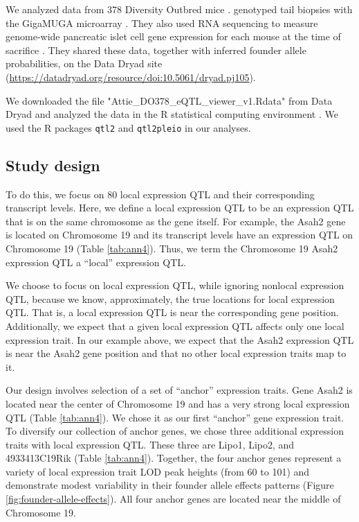 \documentclass{article}
\begin{document}
We analyzed data from 378 Diversity Outbred mice \citep{keller2018genetic}. \citet{keller2018genetic} genotyped tail biopsies with the GigaMUGA microarray \citep{morgan2016mouse}. They also used RNA sequencing to measure genome-wide pancreatic islet cell gene expression for each mouse at the time of sacrifice \citep{keller2018genetic}. They shared these data, together with inferred founder allele probabilities, on the Data Dryad site (\url{https://datadryad.org/resource/doi:10.5061/dryad.pj105}). 

We downloaded the file "Attie\_DO378\_eQTL\_viewer\_v1.Rdata" from Data Dryad \citep{keller2018genetic} and analyzed the data in the R statistical computing environment \citep{r}. We used the R packages \texttt{qtl2} \citep{Broman2018} and \texttt{qtl2pleio} \citep{qtl2pleio} in our analyses. 

\subsection{Study design}

To do this, we focus on 80 local expression QTL and their corresponding transcript levels. Here, we define a local expression QTL to be an expression QTL that is on the same chromosome as the gene itself. For example, the Asah2 gene is located on Chromosome 19 and its transcript levels have an expression QTL on Chromosome 19 (Table \ref{tab:ann4}). Thus, we term the Chromosome 19 Asah2 expression QTL a ``local'' expression QTL. 

We choose to focus on local expression QTL, while ignoring nonlocal expression QTL, because we know, approximately, the true locations for local expression QTL. That is, a local expression QTL is near the corresponding gene position. Additionally, we expect that a given local expression QTL affects only one local expression trait. In our example above, we expect that the Asah2 expression QTL is near the Asah2 gene position and that no other local expression traits map to it.


Our design involves selection of a set of ``anchor'' expression traits. Gene Asah2 is located near the center of Chromosome 19 and has a very strong local expression QTL (Table \ref{tab:ann4}). We chose it as our first ``anchor'' gene expression trait. To diversify our collection of anchor genes, we chose three additional expression traits with local expression QTL. These three are Lipo1, Lipo2, and 4933413C19Rik (Table \ref{tab:ann4}). Together, the four anchor genes represent a variety of local expression trait LOD peak heights (from 60 to 101) and demonstrate modest variability in their founder allele effects patterns (Figure \ref{fig:founder-allele-effects}). All four anchor genes are located near the middle of Chromosome 19.  
\end{document}
